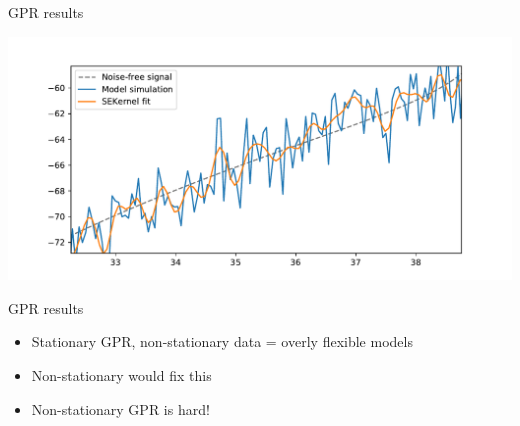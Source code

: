 \documentclass[presentation]{beamer}
\begin{document}
\begin{frame}[label={sec:orgecc9fab}]{GPR results}
\begin{center}
\includegraphics[width=.9\linewidth]{./badfit2.pdf}
\end{center}
\end{frame}

\begin{frame}[label={sec:org96064fc}]{GPR results}
\begin{itemize}
\item Stationary GPR, non-stationary data = overly flexible models
\vfill
\item Non-stationary would fix this
\vfill
\item Non-stationary GPR is hard!
\end{itemize}
\end{frame}
\end{document}
